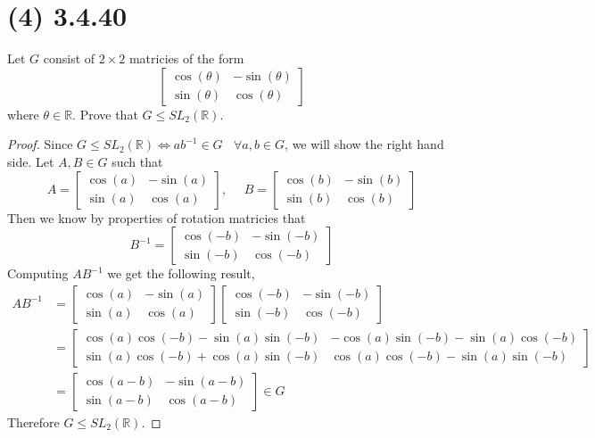 \documentclass{article}
\begin{document}
\section*{(4) 3.4.40}
Let $G$ consist of $2 \times 2$ matricies of the form
\[ 
    \begin{bmatrix}
        \cos(\theta) & -\sin (\theta) \\
        \sin(\theta) & \cos(\theta)
    \end{bmatrix}
\]
where $\theta \in \mathbb{R}$. Prove that $G \leq SL_2(\mathbb{R})$.
\begin{proof}
    Since $G \leq SL_2(\mathbb{R}) \Longleftrightarrow ab^{-1} \in G \ \ \ \ \forall a,b \in G$, we will show the right hand side.
    Let $A,B \in G$ such that
    \[A = \begin{bmatrix}
        \cos(a) & -\sin(a) \\
        \sin(a) & \cos(a)
    \end{bmatrix}, \ \ \ \ \ \ B =
    \begin{bmatrix}
        \cos(b) & -\sin(b) \\
        \sin(b) & \cos(b)
    \end{bmatrix}\]
    Then we know by properties of rotation matricies that
    \[B^{-1}= 
    \begin{bmatrix}
        \cos(-b) & -\sin(-b) \\
        \sin(-b) & \cos(-b)
    \end{bmatrix}\]
    Computing $AB^{-1}$ we get the following result,
    \begin{align*}
        AB^{-1} & = \begin{bmatrix}
            \cos(a) & -\sin(a) \\
            \sin(a) & \cos(a)
        \end{bmatrix}
        \begin{bmatrix}
            \cos(-b) & -\sin(-b) \\
            \sin(-b) & \cos(-b)
        \end{bmatrix}\\ & = \begin{bmatrix}
            \cos(a)\cos(-b)-\sin(a)\sin(-b) & -\cos(a)\sin(-b)-\sin(a)\cos(-b) \\
            \sin(a)\cos(-b)+\cos(a)\sin(-b) & \cos(a)\cos(-b)-\sin(a)\sin(-b)
        \end{bmatrix}
        \\ & = \begin{bmatrix}
            \cos(a-b) & -\sin(a-b) \\
            \sin(a-b) & \cos(a-b)
        \end{bmatrix} \in G
    \end{align*}
    Therefore $G \leq SL_2(\mathbb{R})$.
\end{proof}
\end{document}
